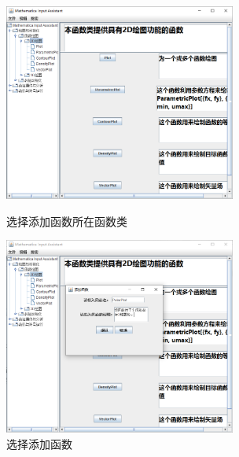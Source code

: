 \documentclass[hyperref, UTF8
,bookmarksnumbered=true, oneside]{ctexbook}
\begin{document}
\begin{itemize}
				\begin{figure}[!h]
	                \begin{minipage}[b]{0.45\textwidth}
	                \centering
	                \includegraphics[width=3in]{10.png}
	                \caption{选择添加函数所在函数类}
	                \label{pic:MathPack}
	                \end{minipage}%
	                \hspace{0.1\textwidth}%
	                \begin{minipage}[b]{0.45\textwidth}
	                \centering
	                \includegraphics[width=3in]{11.png}
	                \caption{选择添加函数}
	                \label{pic:GUIPack}
	                \end{minipage}
            	\end{figure}


\end{itemize}
\end{document}
